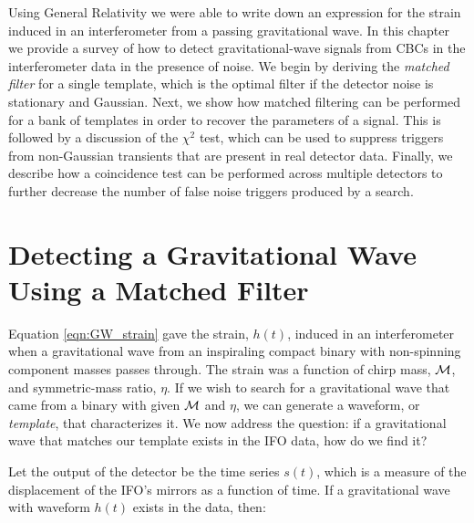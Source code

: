 Using General Relativity we were able to write down an expression for the strain induced in an interferometer from a passing gravitational wave. In this chapter we provide a survey of how to detect gravitational-wave signals from \acp{CBC} in the interferometer data in the presence of noise. We begin by deriving the \emph{matched filter} for a single template, which is the optimal filter if the detector noise is stationary and Gaussian. Next, we show how matched filtering can be performed for a bank of templates in order to recover the parameters of a signal. This is followed by a discussion of the $\chi^2$ test, which can be used to suppress triggers from non-Gaussian transients that are present in real detector data. Finally, we describe how a coincidence test can be performed across multiple detectors to further decrease the number of false noise triggers produced by a search.

\section{Detecting a Gravitational Wave Using a Matched Filter}
\label{sec:matched_filter}

Equation \ref{eqn:GW_strain} gave the strain, $h(t)$, induced in an interferometer when a gravitational wave from an inspiraling compact binary with non-spinning component masses passes through. The strain was a function of chirp mass, $\mathcal{M}$, and symmetric-mass ratio, $\eta$. If we wish to search for a gravitational wave that came from a binary with given $\mathcal{M}$ and $\eta$, we can generate a waveform, or \emph{template}, that characterizes it. We now address the question: if a gravitational wave that matches our template exists in the \ac{IFO} data, how do we find it?

Let the output of the detector be the time series $s(t)$, which is a measure of the displacement of the \ac{IFO}'s mirrors as a function of time. If a gravitational wave with waveform $h(t)$ exists in the data, then:

